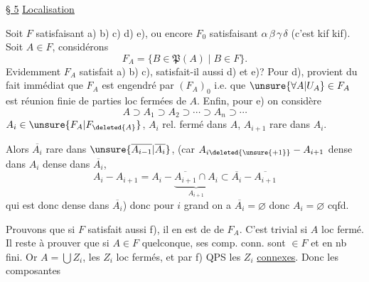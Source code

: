
\uline{§ 5} \uline{Localisation}

Soit $F$ satisfaisant a) b) c) d) e), ou encore $F_0$ satisfaisant $\alpha\,\beta\,\gamma\,\delta$ (c'est kif kif). Soit $A\in F$, considérons
\[
F_A=\{B\in\mathfrak P(A)\mid B\in F\}.
\]
Evidemment $F_A$ satisfait a) b) c), satisfait-il aussi d) et e)? Pour d),  provient du fait immédiat que $F_A$ est engendré par $(F_A)_0$ i.e. que $\unsure{\forall A|U_A}\in F_A$ est réunion finie de parties loc fermées  de $A$.  Enfin, pour e) on considère
\[
A\supset A_1\supset A_2\supset\cdots\supset A_n\supset\cdots
\]
$A_i\in \unsure{F_A|F_{\deleted{A}}}$, $A_i$ rel. fermé dans $A$, $A_{i+1}$ rare dans $A_i$.

Alors $\overline{A_i}$ rare dans $\unsure{\overline{A_{i-1}}|\overline{A_i}}$,  (car $A_{i\deleted{\unsure{+1}}}-A_{i+1}$ dense dans $A_i$ dense dans $\overline{A_i}$,  
\[
A_i-A_{i+1}=A_i-\underbrace{\overline{A_{i+1}}\cap A_i}_{A_{i+1}}\subset\overline{A_i}-\overline{A_{i+1}}
\]
qui est donc dense dans $\overline{A_i}$) donc pour $i$ grand on a $\overline{A_i}=\varnothing$ donc $A_i=\varnothing$ cqfd.

Prouvons que si $F$ satisfait aussi f), il en est de  de $F_A$. C'est trivial si $A$ loc fermé. Il reste à prouver que si $A\in F$ quelconque, ses comp. conn. sont $\in F$ et en nb fini. Or $A=\bigcup Z_i$, les $Z_i$ loc fermés, et par f) QPS les $Z_i$ \uline{connexes}. Donc les composantes
